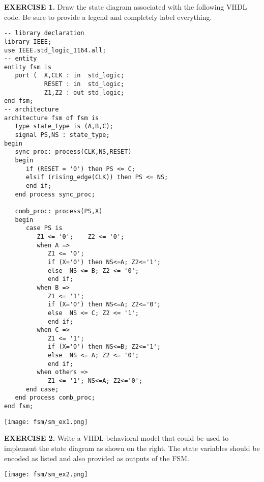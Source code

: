 \vspace{20pt}
\noindent
\begin{minipage}{1\textwidth}
\textbf{EXERCISE 1.}
Draw the state diagram associated with the following VHDL code. Be sure to provide a legend and completely label everything.
\end{minipage}
\begin{minipage}{0.66\textwidth}
\vspace{10px}
\begin{lstlisting}
-- library declaration
library IEEE;
use IEEE.std_logic_1164.all;
-- entity
entity fsm is 
   port (  X,CLK : in  std_logic; 
           RESET : in  std_logic; 
           Z1,Z2 : out std_logic;  
end fsm;
-- architecture
architecture fsm of fsm is
   type state_type is (A,B,C);
   signal PS,NS : state_type;
begin
   sync_proc: process(CLK,NS,RESET)
   begin
      if (RESET = '0') then PS <= C; 
      elsif (rising_edge(CLK)) then PS <= NS; 
      end if; 
   end process sync_proc; 

   comb_proc: process(PS,X)
   begin
      case PS is 
         Z1 <= '0';    Z2 <= '0'; 
         when A =>    
            Z1 <= '0';  
            if (X='0') then NS<=A; Z2<='1';   
            else  NS <= B; Z2 <= '0';
            end if; 
         when B =>    
            Z1 <= '1';  
            if (X='0') then NS<=A; Z2<='0';  
            else  NS <= C; Z2 <= '1'; 
            end if; 
         when C =>    
            Z1 <= '1';  
            if (X='0') then NS<=B; Z2<='1'; 
            else  NS <= A; Z2 <= '0'; 
            end if; 
         when others =>    
            Z1 <= '1'; NS<=A; Z2<='0'; 
      end case; 
   end process comb_proc; 
end fsm;
\end{lstlisting}
\end{minipage}
\begin{minipage}{0.33\textwidth}
\texttt{[image: fsm/sm\_ex1.png]}
\vspace{250px}
\end{minipage}

\vspace{20pt}
\noindent
\begin{minipage}[t]{0.5\textwidth}
\textbf{EXERCISE 2.}
Write a VHDL behavioral model that could be used to implement the state diagram as shown on the right. The state variables should be encoded as listed and also provided as outputs of the FSM.
\end{minipage}
\begin{minipage}[t]{0.47\textwidth}
\vspace{0pt}\raggedright
\centering
\texttt{[image: fsm/sm\_ex2.png]}
\end{minipage}

